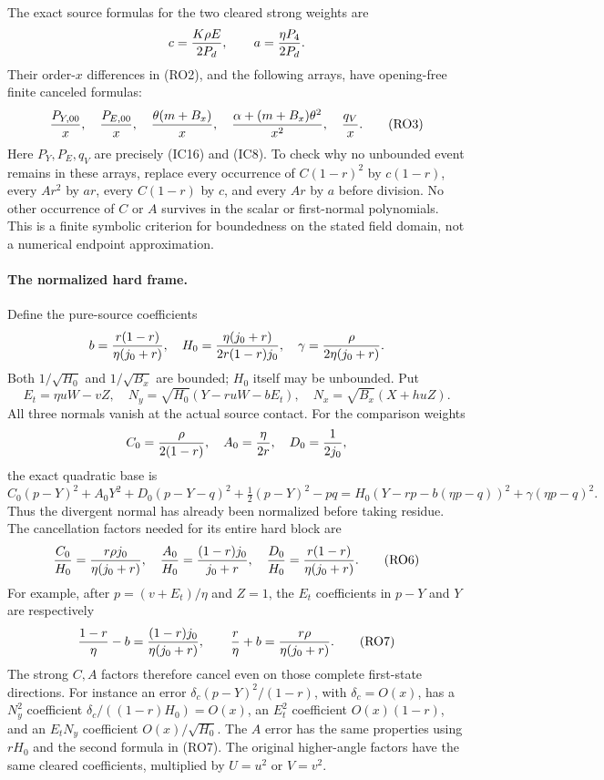 The exact source formulas for the two cleared strong weights are
\[
 c={K\rho E\over2P_d},\qquad a={\eta P_4\over2P_d}.
\]
Their order-$x$ differences in (RO2), and the following arrays, have
opening-free finite canceled formulas:
\[
 {P_{Y,00}\over x},\quad {P_{E,00}\over x},\quad
 {\theta(m+B_x)\over x},\quad
 {\alpha+(m+B_x)\theta^2\over x^2},\quad {q_V\over x}.
                                                               \tag{RO3}
\]
Here $P_Y,P_E,q_V$ are precisely (IC16) and (IC8). To check why no
unbounded event remains in these arrays, replace every occurrence of
$C(1-r)^2$ by $c(1-r)$, every $Ar^2$ by $ar$, every
$C(1-r)$ by $c$, and every $Ar$ by $a$ before division. No other
occurrence of $C$ or $A$ survives in the scalar or first-normal
polynomials.  This is a finite symbolic
criterion for boundedness on the stated field domain, not a numerical
endpoint approximation.

\paragraph{The normalized hard frame.}
Define the pure-source coefficients
\[
 b={r(1-r)\over\eta(j_0+r)},\quad
 H_0={\eta(j_0+r)\over2r(1-r)j_0},\quad
 \gamma={\rho\over2\eta(j_0+r)}.
\]
Both $1/\sqrt{H_0}$ and $1/\sqrt{B_x}$ are bounded; $H_0$
itself may be unbounded. Put
\[
 E_t=\eta uW-vZ,\quad
 N_y=\sqrt{H_0}(Y-ruW-bE_t),\quad
 N_x=\sqrt{B_x}(X+huZ).                              \tag{RO4}
\]
All three normals vanish at the actual source contact. For the
comparison weights
\[
 C_0={\rho\over2(1-r)},\quad A_0={\eta\over2r},\quad
 D_0={1\over2j_0},
\]
the exact quadratic base is
\[
 C_0(p-Y)^2+A_0Y^2+D_0(p-Y-q)^2+\tfrac12(p-Y)^2-pq
       =H_0(Y-rp-b(\eta p-q))^2+\gamma(\eta p-q)^2.  \tag{RO5}
\]
Thus the divergent normal has already been normalized before taking
residue. The cancellation factors needed for its entire hard block are
\[
 {C_0\over H_0}={r\rho j_0\over\eta(j_0+r)},\quad
 {A_0\over H_0}={(1-r)j_0\over j_0+r},\quad
 {D_0\over H_0}={r(1-r)\over\eta(j_0+r)}.             \tag{RO6}
\]
For example, after $p=(v+E_t)/\eta$ and $Z=1$, the $E_t$
coefficients in $p-Y$ and $Y$ are respectively
\[
 {1-r\over\eta}-b={(1-r)j_0\over\eta(j_0+r)},\qquad
 {r\over\eta}+b={r\rho\over\eta(j_0+r)}.            \tag{RO7}
\]
The strong $C,A$ factors therefore cancel even on those complete
first-state directions. For instance an error
$\delta_c(p-Y)^2/(1-r)$, with $\delta_c=O(x)$, has a
$N_y^2$ coefficient $\delta_c/((1-r)H_0)=O(x)$,
an $E_t^2$ coefficient $O(x)(1-r)$, and an $E_tN_y$
coefficient $O(x)/\sqrt{H_0}$. The $A$ error has the same
properties using $rH_0$ and the second formula in (RO7).
The original higher-angle factors have the same cleared coefficients,
multiplied by $U=u^2$ or $V=v^2$.

